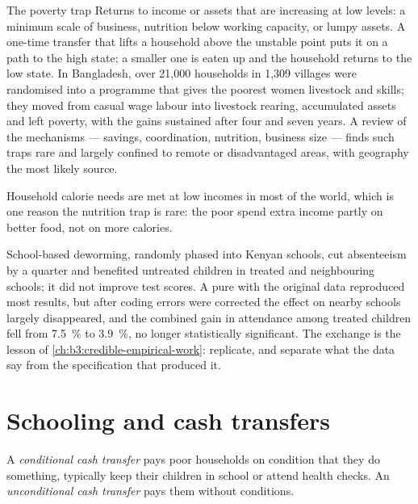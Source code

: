 \begin{model}{The poverty trap}
\assumes Returns to income or assets that are increasing at low levels: a minimum
scale of business, nutrition below working capacity, or lumpy assets.
\predicts A one-time transfer that lifts a household above the unstable point puts
it on a path to the high state; a smaller one is eaten up and the household returns
to the low state.
\tested In Bangladesh, over 21,000 households in 1,309 villages were randomised into a programme that gives
the poorest women livestock and skills; they moved from casual wage labour into
livestock rearing, accumulated assets and left poverty, with the gains sustained
after four and seven years. %
\breaks A review of the mechanisms --- savings, coordination, nutrition, business
size --- finds such traps rare and largely confined to remote or disadvantaged
areas, with geography the most likely source. %
\end{model}

Household calorie needs are met at low incomes in most of the world, which is one
reason the nutrition trap is rare: the poor spend extra income partly on better
food, not on more calories.

\begin{record}[Deworming]
School-based deworming, randomly phased into Kenyan schools, cut absenteeism by a quarter
and benefited untreated children in treated and neighbouring schools; it did not
improve test scores. %
A pure  with the original data reproduced most results, but after
coding errors were corrected the effect on nearby schools largely disappeared, and
the combined gain in attendance among treated children fell from 7.5~\% to 3.9~\%, no longer
statistically significant. %
The exchange is the lesson of \cref{ch:b3:credible-empirical-work}: replicate, and
separate what the data say from the specification that produced it.
\end{record}

\section{Schooling and cash transfers}\label{sec:b3:development-microeconomics:cash}

\begin{definition}\label{def:b3:development-microeconomics:cash-transfer}
A \emph{conditional cash transfer} pays poor households on condition that they do
something, typically keep their children in school or attend health checks. An
\emph{unconditional cash transfer} pays them without conditions.
\end{definition}

